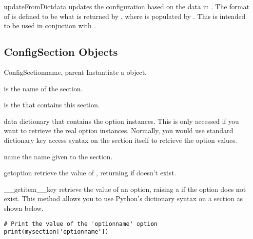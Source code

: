 \begin{methoddesc}[ConfigManager]{updateFromDict}{data}
  updates the configuration based on the data in . The format of
   is defined to be what is returned by
  , where  is populated by
  . This is intended to be used in conjuction with
  .
\end{methoddesc}

\subsection{ConfigSection Objects}

\begin{classdesc}{ConfigSection}{name, parent}
Instantiate a  object.

 is the name of the section.

 is the  that contains this section.
\end{classdesc}

\begin{memberdesc}[ConfigSection]{data}
dictionary that contains the option instances.  This is only accessed
if you want to retrieve the real option instances.  Normally, you would
use standard dictionary key access syntax on the section itself to
retrieve the option values.
\end{memberdesc}

\begin{memberdesc}[ConfigSection]{name}
the name given to the section.
\end{memberdesc}

\begin{methoddesc}[ConfigManager]{get}{option}
retrieve the value of , returning  if  doesn't exist.
\end{methoddesc}

\begin{methoddesc}[ConfigSection]{__getitem__}{key}
  retrieve the value of an option, raising a  if the option
  does not exist. This method allows you to use Python's dictionary syntax on a
  section as shown below.
\begin{verbatim}
# Print the value of the 'optionname' option
print(mysection['optionname'])
\end{verbatim}

\end{methoddesc}

